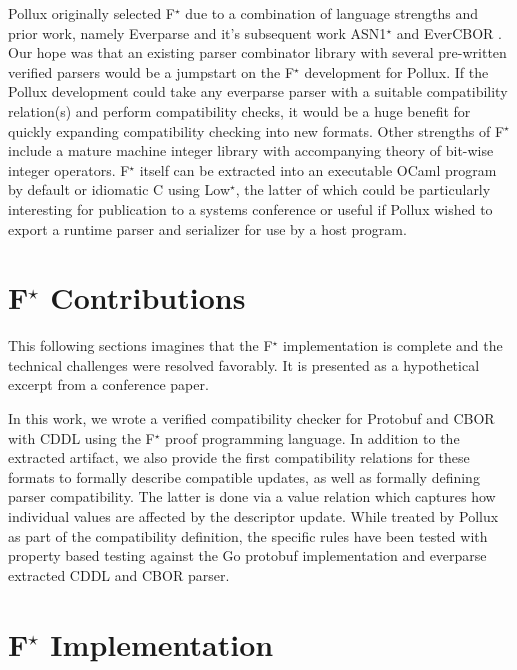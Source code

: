 \documentclass[11pt]{article}
\newcommand{\fstar}{F$^\star$}
\begin{document}
Pollux originally selected \fstar{} due to a combination of language strengths
and prior work, namely Everparse \cite{ramananandroEverParseVerifiedSecure2019}
and it's subsequent work ASN1$^{\star}$ and EverCBOR
\cite{ramananandroSecureParsingSerializing2025,niASN1ProvablyCorrect2023}. Our
hope was that an existing parser combinator library with several pre-written
verified parsers would be a jumpstart on the \fstar{} development for Pollux. If
the Pollux development could take any everparse parser with a suitable
compatibility relation(s) and perform compatibility checks, it would be a huge
benefit for quickly expanding compatibility checking into new formats. Other
strengths of \fstar{} include a mature machine integer library with accompanying
theory of bit-wise integer operators. \fstar{} itself can be extracted into an
executable OCaml program by default or idiomatic C using Low$^{\star}$, the latter
of which could be particularly interesting for publication to a systems
conference or useful if Pollux wished to export a runtime parser and serializer
for use by a host program.

\section{\fstar{} Contributions}

\begin{info}
  This following sections imagines that the \fstar{} implementation is complete
  and the technical challenges were resolved favorably. It is presented as a
  hypothetical excerpt from a conference paper.
\end{info}

In this work, we wrote a verified compatibility checker for Protobuf and CBOR
with CDDL using the \fstar{} proof programming language. In addition to the
extracted artifact, we also provide the first compatibility relations for these
formats to formally describe compatible updates, as well as formally defining
parser compatibility. The latter is done via a value relation which captures how
individual values are affected by the descriptor update. While treated by Pollux
as part of the compatibility definition, the specific rules have been tested
with property based testing against the Go protobuf implementation and everparse
extracted CDDL and CBOR parser.

\section{\fstar{} Implementation}
\end{document}
